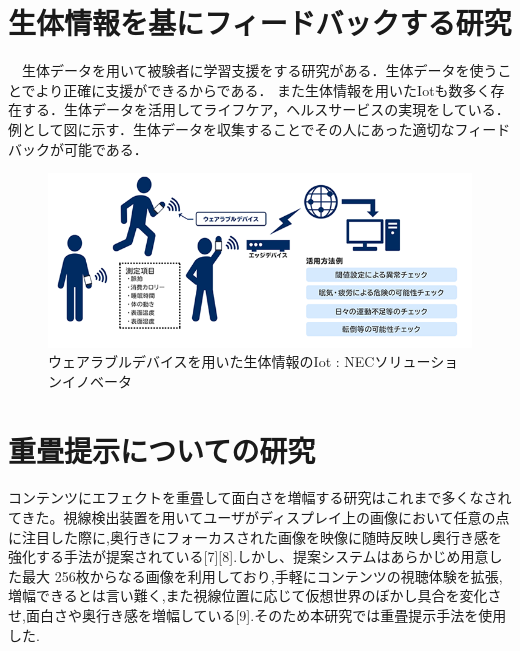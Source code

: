 \section{生体情報を基にフィードバックする研究}
　生体データを用いて被験者に学習支援をする研究がある\cite{seitai1,seitai2,seitai3}．生体データを使うことでより正確に支援ができるからである．
また生体情報を用いたIotも数多く存在する．生体データを活用してライフケア，ヘルスサービスの実現をしている．
例として図に示す．生体データを収集することでその人にあった適切なフィードバックが可能である．

\begin{figure}[H]
    \centering
    \includegraphics[width=15cm]{images/chapter2/body_img02.png}
    \caption{ウェアラブルデバイスを用いた生体情報のIot : NECソリューションイノベータ}
\end{figure}


\section{重畳提示についての研究}
コンテンツにエフェクトを重畳して面白さを増幅する研究はこれまで多くなされてきた。視線検出装置を用いてユーザがディスプレイ上の画像において任意の点に注目した際に,奥行きにフォーカスされた画像を映像に随時反映し奥行き感を強化する手法が提案されている[7][8].しかし、提案システムはあらかじめ用意した最大 256枚からなる画像を利用しており,手軽にコンテンツの視聴体験を拡張,増幅できるとは言い難く,また視線位置に応じて仮想世界のぼかし具合を変化させ,面白さや奥行き感を増幅している[9].そのため本研究では重畳提示手法を使用した.


